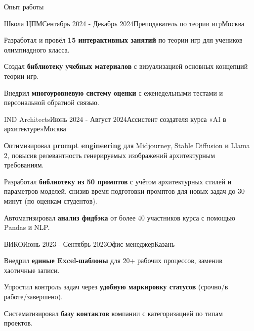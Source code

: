 \documentclass[10pt]{resume} %
\begin{document}
\begin{rSection}{Опыт работы}

\begin{rSubsection}{Школа ЦПМ}{Сентябрь 2024 - Декабрь 2024}{Преподаватель по теории игр}{Москва}
\item Разработал и провёл \textbf{15 интерактивных занятий} по теории игр для учеников олимпиадного класса.
\item Создал \textbf{библиотеку учебных материалов} с визуализацией основных концепций теории игр.
\item Внедрил \textbf{многоуровневую систему оценки} с еженедельными тестами и персональной обратной связью.
\end{rSubsection}

	\begin{rSubsection}{IND Architects}{Июнь 2024 - Август 2024}{Ассистент создателя курса «AI в архитектуре»}{Москва}
		\item  Оптимизировал \textbf{prompt engineering} для Midjourney, Stable Diffusion и Llama 2, повысив релевантность генерируемых изображений архитектурным требованиям.
		\item  Разработал \textbf{библиотеку из 50 промптов} с учётом архитектурных стилей и параметров моделей, снизив время подготовки промптов для новых задач до 30 минут (по оценкам студентов).
  \item Автоматизировал \textbf{анализ фидбэка}  от более 40 участников курса с помощью Pandas и NLP.
	\end{rSubsection}
        
         \begin{rSubsection}{ВИКО}{Июнь 2023 - Сентябрь 2023}{Офис-менеджер}{Казань}
		\item Внедрил \textbf{единые Excel-шаблоны} для 20+ рабочих процессов, заменив хаотичные записи.
    \item Упростил контроль задач через \textbf{удобную маркировку статусов} (срочно/в работе/завершено).
    \item Систематизировал \textbf{базу контактов} компании с категоризацией по типам проектов.
	\end{rSubsection}


\end{rSection}
\end{document}
